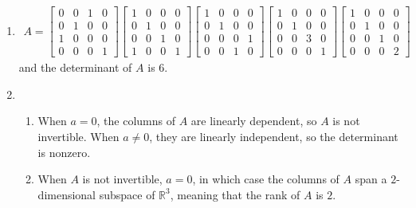\documentclass[red]{tutorial}
\newcommand{\R}{\mathbb{R}}
\theoremstyle{definition}
\theoremstyle{theorem}
\begin{document}
\begin{solutions}
\begin{enumerate}
\begin{enumerate}
      \end{enumerate}
    \item
      \begin{align*}
        A = 
        \begin{bmatrix}
          0 & 0 & 1 & 0 \\
          0 & 1 & 0 & 0 \\
          1 & 0 & 0 & 0 \\
          0 & 0 & 0 & 1
        \end{bmatrix}
        \begin{bmatrix}
          1 & 0 & 0 & 0 \\
          0 & 1 & 0 & 0 \\
          0 & 0 & 1 & 0 \\
          1 & 0 & 0 & 1
        \end{bmatrix}
        \begin{bmatrix}
          1 & 0 & 0 & 0 \\
          0 & 1 & 0 & 0 \\
          0 & 0 & 0 & 1 \\
          0 & 0 & 1 & 0
        \end{bmatrix}
        \begin{bmatrix}
          1 & 0 & 0 & 0 \\
          0 & 1 & 0 & 0 \\
          0 & 0 & 3 & 0 \\
          0 & 0 & 0 & 1
        \end{bmatrix}
        \begin{bmatrix}
          1 & 0 & 0 & 0 \\
          0 & 1 & 0 & 0 \\
          0 & 0 & 1 & 0 \\
          0 & 0 & 0 & 2
        \end{bmatrix}
      \end{align*}
      and the determinant of $A$ is $6$.
    \item 
      \begin{enumerate}
        \item When $a=0$, the columns of $A$ are linearly dependent, so 
          $A$ is not invertible. When $a\neq 0$, they are linearly 
          independent, so the determinant is nonzero.
        \item When $A$ is not invertible, $a=0$, in which case 
          the columns of $A$ span a $2$-dimensional subspace of 
          $\R^3$, meaning that the rank of $A$ is $2$.

\end{enumerate}
\end{enumerate}
\end{solutions}
\end{document}
